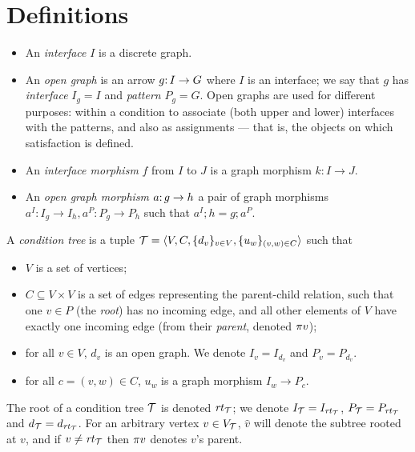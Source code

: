 \section{Definitions}
\label{sec:definitions}

\begin{itemize}
\item An \emph{interface} $I$ is a discrete graph.

\item An \emph{open graph} is an arrow $g{:}\, I\rightarrow G$ where $I$ is an interface; we say that $g$ has \emph{interface} $I_g=I$ and \emph{pattern} $P_g=G$. Open graphs are used for different purposes: within a condition to associate (both upper and lower) interfaces with the patterns, and also as assignments --- that is, the objects on which satisfaction is defined.

\item An \emph{interface morphism} $f$ from $I$ to $J$ is a graph morphism $k:I\to J$.

\item An \emph{open graph morphism} $a{:}\, g\rightarrow h$ a pair of graph morphisms $a^I:I_g\to I_h, a^P:P_g\to P_h$ such that $a^I;h=g;a^P$.
\end{itemize}
%
\begin{definition}\label{def:condition tree}
A \emph{condition tree} is a tuple ${\mathcal{T}}=\langle V, C, \{{d_v}\}_{v\in V}, \{{u_w}\}_{(v,w)\in C}\rangle$ such that

\begin{itemize}[topsep=\smallskipamount]
\item $V$ is a set of vertices;

\item $C\subseteq V\times V$ is a set of edges representing the parent-child relation, such that one $v\in P$ (the \emph{root}) has no incoming edge, and all other elements of $V$ have exactly one incoming edge (from their \emph{parent}, denoted $\pi{v}$);

\item for all $v\in V$, $d_v$ is an open graph. We denote $I_v=I_{d_v}$ and $P_v=P_{d_v}$.

\item for all $c=(v,w)\in C$, $u_w$ is a graph morphism $I_w\to P_c$.
\end{itemize}
\end{definition}
%
The root of a condition tree ${\mathcal{T}}$ is denoted $\mathit{rt}_{{\mathcal{T}}}$; we denote $I_{\mathcal{T}}=I_{\mathit{rt}_{{\mathcal{T}}}}$, $P_{\mathcal{T}}=P_{\mathit{rt}_{{\mathcal{T}}}}$ and $d_{\mathcal{T}}=d_{\mathit{rt}_{{\mathcal{T}}}}$. For an arbitrary vertex $v\in V_{\mathcal{T}}$, $\hat v$ will denote the subtree rooted at $v$, and if $v\neq\mathit{rt}_{{\mathcal{T}}}$ then $\pi{v}$ denotes $v$'s parent.

